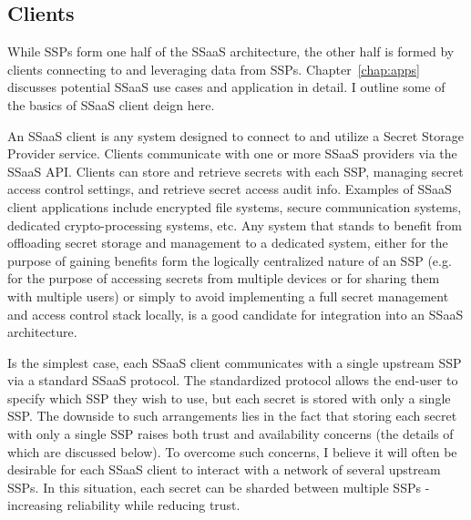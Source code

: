 \subsection{Clients}

While SSPs form one half of the SSaaS architecture, the other half is
formed by clients connecting to and leveraging data from
SSPs. Chapter~\ref{chap:apps} discusses potential SSaaS use cases and
application in detail. I outline some of the basics of SSaaS client
deign here.

An SSaaS client is any system designed to connect to and utilize a
Secret Storage Provider service. Clients communicate with one or more
SSaaS providers via the SSaaS API. Clients can store and retrieve
secrets with each SSP, managing secret access control settings, and
retrieve secret access audit info. Examples of SSaaS client
applications include encrypted file systems, secure communication
systems, dedicated crypto-processing systems, etc. Any system that
stands to benefit from offloading secret storage and management to a
dedicated system, either for the purpose of gaining benefits form the
logically centralized nature of an SSP (e.g. for the purpose of
accessing secrets from multiple devices or for sharing them with
multiple users) or simply to avoid implementing a full secret
management and access control stack locally, is a good candidate for
integration into an SSaaS architecture.

Is the simplest case, each SSaaS client communicates with a single
upstream SSP via a standard SSaaS protocol. The standardized protocol
allows the end-user to specify which SSP they wish to use, but each
secret is stored with only a single SSP. The downside to such
arrangements lies in the fact that storing each secret with only a
single SSP raises both trust and availability concerns (the details of
which are discussed below). To overcome such concerns, I believe it
will often be desirable for each SSaaS client to interact with a
network of several upstream SSPs. In this situation, each secret can
be sharded between multiple SSPs - increasing reliability while
reducing trust.


